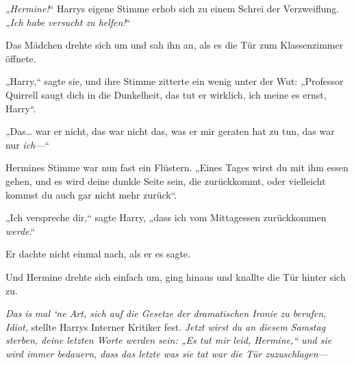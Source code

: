 „\emph{Hermine!}“ Harrys eigene Stimme erhob sich zu einem Schrei der Verzweiflung. „\emph{Ich habe versucht zu helfen!}“

Das Mädchen drehte sich um und sah ihn an, als es die Tür zum Klassenzimmer öffnete.

„Harry,“ sagte sie, und ihre Stimme zitterte ein wenig unter der Wut: „Professor Quirrell saugt dich in die Dunkelheit, das tut er wirklich, ich meine es ernst, Harry“.

„Das… war er nicht, das war nicht das, was er mir geraten hat zu tun, das war nur \emph{ich}—“

Hermines Stimme war nun fast ein Flüstern. „Eines Tages wirst du mit ihm essen gehen, und es wird deine dunkle Seite sein, die zurückkommt, oder vielleicht kommst du auch gar nicht mehr zurück“.

„Ich verspreche dir,“ sagte Harry, „dass ich vom Mittagessen zurückkommen \emph{werde}.“

Er dachte nicht einmal nach, als er es sagte.

Und Hermine drehte sich einfach um, ging hinaus und knallte die Tür hinter sich zu.

\emph{Das} \emph{is} \emph{mal `ne Art, sich auf die Gesetze der dramatischen Ironie zu berufen, Idiot,} stellte Harrys Interner Kritiker fest. \emph{Jetzt wirst du an diesem Samstag sterben, deine letzten Worte werden sein: „Es tut mir leid, Hermine,“ und sie wird immer bedauern, dass das letzte was sie tat war die Tür zuzuschlagen—}

